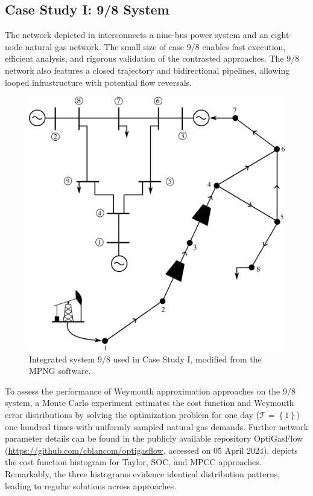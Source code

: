 \subsection{Case Study I: 9/8 System}


The network depicted in  interconnects a nine-bus power system and an eight-node natural gas network. The small size of case 9/8 enables fast execution, efficient analysis, and rigorous validation of the contrasted approaches. The 9/8 network also features a closed trajectory and bidirectional pipelines, allowing looped infrastructure with potential flow reversals.
\begin{figure}[H]
    \centering
    \includegraphics[scale=0.7]{figures/Chapter_MPCC/8 node 9 bus network.png}
    \caption{Integrated system 9/8 used in Case Study I, modified from the MPNG software.~\cite{Wilson_poly}}
    \label{fig:8-9 network}
\end{figure}

To assess the performance of Weymouth approximation approaches on the 9/8 system, a Monte Carlo experiment estimates the cost function and Weymouth error distributions by solving the optimization problem for one day ($\mathcal{T}=\left\lbrace 1\right\rbrace$) one hundred times with uniformly sampled natural gas demands. Further network parameter details can be found in the publicly available repository OptiGasFlow ({\url{https://github.com/cblancom/optigasflow}}, accessed on 05 April 2024). 
  depicts the cost function histogram for Taylor, SOC, and MPCC approaches. Remarkably, the three histograms evidence identical distribution patterns, leading to regular solutions across approaches.

